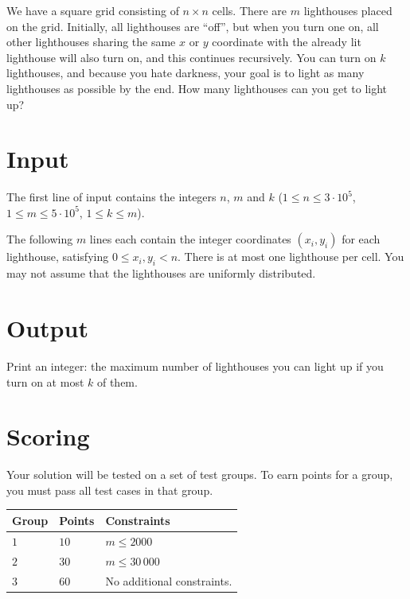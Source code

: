 

We have a square grid consisting of $n \times n$ cells. There are $m$ lighthouses placed on the grid.
Initially, all lighthouses are ``off'', but when you turn one on, all other lighthouses sharing the same
$x$ or $y$ coordinate with the already lit lighthouse will also turn on, and this continues recursively.
You can turn on $k$ lighthouses, and because you hate darkness, your goal is to light as many lighthouses
as possible by the end. How many lighthouses can you get to light up?

\section*{Input}
The first line of input contains the integers $n$, $m$ and $k$ ($1 \leq n \leq 3 \cdot 10^5$, $1 \leq m \leq 5 \cdot 10^5$, $1 \leq k \leq m$).

The following $m$ lines each contain the integer coordinates $(x_i, y_i)$ for each lighthouse, satisfying $0 \le x_i, y_i < n$.
There is at most one lighthouse per cell. You may not assume that the lighthouses are uniformly distributed.

\section*{Output}
Print an integer: the maximum number of lighthouses you can light up if you turn on at most $k$ of them.


\section*{Scoring}
Your solution will be tested on a set of test groups.
To earn points for a group, you must pass all test cases in that group.

\noindent
\begin{tabular}{| l | l | p{12cm} |}
  \hline
  \textbf{Group} & \textbf{Points} & \textbf{Constraints} \\ \hline
  $1$    & $10$      & $m \leq 2000$ \\ \hline
  $2$    & $30$      & $m \leq 30\,000$ \\ \hline
  $3$    & $60$      & No additional constraints. \\ \hline
\end{tabular}
